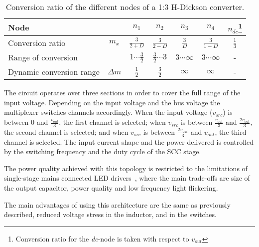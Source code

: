 \begin{table}[h]
\centering
\caption{Conversion ratio of the different nodes of a 1:3 H-Dickson converter.}
\label{tab:1:3 H-Dick_M}
\renewcommand{\arraystretch}{1.5}%
\begin{tabular}{l  c | c c c c c }
 Node &  & $n_1$ & $n_2$ & $n_3$ & $n_4$ & $n_{dc}$\footnote{Conversion ratio for the \emph{dc}-node is taken with respect to $v_{out}$} \\
 \midrule
 Conversion ratio & $m_x$ & $\frac{3}{2+D} $    & $\frac{3}{2-D} $ & $\frac{3}{D} $ & $\frac{3}{1-D} $ & $\frac{1}{3}$ \\
 Range of conversion &       & $1 \cdots \frac{3}{2}$ & $\frac{3}{2} \cdots 3 $ & $3 \cdots \infty $ & $ 3 \cdots \infty $ & - \\
 Dynamic conversion range & $\Delta m$ &  $\frac{1}{2}$ &  $\frac{3}{2}$ &  $\infty$ &  $\infty$ &  -
\end{tabular}
\end{table}

The circuit operates over three sections in order to cover the full range of the input voltage.  Depending on the input voltage and the bus voltage the multiplexer switches channels accordingly. When the input voltage ($v_{src}$) is between $0$  and $ \frac{v_{out}}{3}$, the first channel is selected; when $v_{src}$ is between $\frac{v_{out}}{3}$ and $\frac{2 v_{out}}{3}$, the second channel is selected; and when $v_{src}$ is between $\frac{2 v_{out}}{3}$ and $v_{out}$, the third channel is selected. The input current shape and the power delivered is controlled by the switching frequency and the duty cycle of the SCC stage.

The power quality achieved with this topology is restricted to the limitations of single-stage mains connected LED drivers~\cite{1991Kheraluwala,2003AND8124D,2009Yuequan,2012Yuequan}, where the main trade-offs are size of the output capacitor, power quality and low frequency light flickering.

The main advantages of using this architecture are the same as previously described, reduced voltage stress in the inductor, and in the switches.


